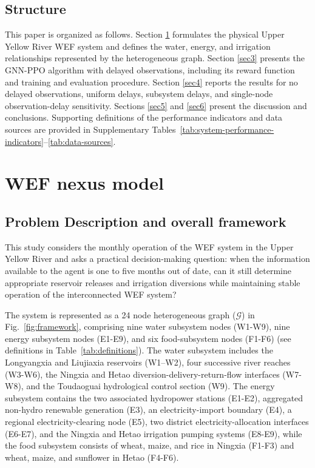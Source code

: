 \documentclass [a4paper,fleqn] {cas-dc}
\begin{document}
\subsection{Structure} \label{sec13}
This paper is organized as follows. Section \ref{sec2} formulates the physical Upper Yellow River WEF system and defines the water, energy, and irrigation relationships represented by the heterogeneous graph. Section \ref{sec3} presents the GNN-PPO algorithm with delayed observations, including its reward function and training and evaluation procedure. Section \ref{sec4} reports the results for no delayed observations, uniform delays, subsystem delays, and single-node observation-delay sensitivity. Sections \ref{sec5} and \ref{sec6} present the discussion and conclusions. Supporting definitions of the performance indicators and data sources are provided in Supplementary Tables~\ref{tab:system-performance-indicators}--\ref{tab:data-sources}.



\section{WEF nexus model} \label{sec2}

\subsection{Problem Description and overall framework}

\label{sec21}
This study considers the monthly operation of the WEF system in the Upper Yellow River and asks a practical decision-making question: when the information available to the agent is one to five months out of date, can it still determine appropriate reservoir releases and irrigation diversions while maintaining stable operation of the interconnected WEF system? 

The system is represented as a 24 node heterogeneous graph ($\mathcal{G}$) in Fig.~\ref{fig:framework}, comprising nine water subsystem nodes (W1-W9), nine energy subsystem nodes (E1-E9), and six food-subsystem nodes (F1-F6) (see definitions in Table~\ref{tab:definitions}). The water subsystem includes the Longyangxia and Liujiaxia reservoirs (W1--W2), four successive river reaches (W3-W6), the Ningxia and Hetao diversion-delivery-return-flow interfaces (W7-W8), and the Toudaoguai hydrological control section (W9). The energy subsystem contains the two associated hydropower stations (E1-E2), aggregated non-hydro renewable generation (E3), an electricity-import boundary (E4), a regional electricity-clearing node (E5), two district electricity-allocation interfaces (E6-E7), and the Ningxia and Hetao irrigation pumping systems (E8-E9), while the food subsystem consists of wheat, maize, and rice in Ningxia (F1-F3) and wheat, maize, and sunflower in Hetao (F4-F6).
\end{document}
